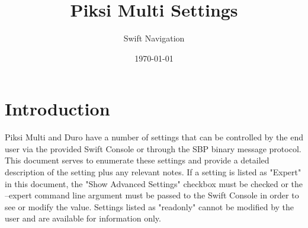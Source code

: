 \documentclass{article}
\title{Piksi Multi Settings}
\author{Swift Navigation}
\date{\today}
\numberwithin{table}{subsection}
\numberwithin{field}{subsection}
\newcommand*{\myfont}{\fontfamily{qtm}\selectfont}
\begin{document}
\maketitle
\thispagestyle{firstpage}

\section{Introduction}
\label{sec:settings}
\begin{flushleft}
Piksi{\myfont\raisebox{0.4ex}\tiny\textregistered} Multi and Duro{\myfont\raisebox{0.4ex}\tiny\textregistered} have a number of settings that can be controlled by the end user via the provided Swift Console or through the SBP binary message protocol. This document serves to enumerate these settings and provide a detailed description of the setting plus any relevant notes. If a setting is listed as "Expert" in this document, the "Show Advanced Settings" checkbox must be checked or the --expert command line argument must be passed to the Swift Console in order to see or modify the value.  Settings listed as "readonly" cannot be modified by the user and are available for information only.
\end{flushleft}
\end{document}
